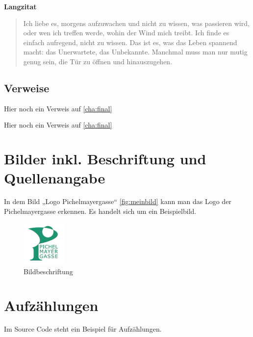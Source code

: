  \autocite{knallgelb}

\textbf{Langzitat}

\begin{quotation}
	Ich liebe es, morgens aufzuwachen und nicht zu wissen, was passieren wird, oder wen ich treffen werde, wohin der Wind mich treibt. Ich finde es einfach aufregend, nicht zu wissen. Das ist es, was das Leben spannend macht: das Unerwartete, das Unbekannte. Manchmal muss man nur mutig genug sein, die Tür zu öffnen und hinauszugehen. \autocite{knallgelb}
\end{quotation}

\subsection{Verweise}
\label{subsec:verweise}

Hier noch ein Verweis auf \cref{cha:final} %

Hier noch ein Verweis auf \vref{cha:final} %

\section{Bilder inkl. Beschriftung und Quellenangabe}
\label{sec:images}

In dem Bild „Logo Pichelmayergasse“ \vref{fig:meinbild} kann man das Logo der Pichelmayergasse erkennen. Es handelt sich um ein Beispielbild.

\begin{figure}[ht]
	\centering
	\includegraphics[width=0.2\textwidth]{figures/BRG_10_Logo.png} %
	\caption[Bildbeschriftung im Abbildungsverzeichnis]{Bildbeschriftung\protect\footnotemark}
	\label{fig:meinbild}
\end{figure}

\section{Aufzählungen}
\label{sec:aufzaehlungen}

Im Source Code steht ein Beispiel für Aufzählungen.

